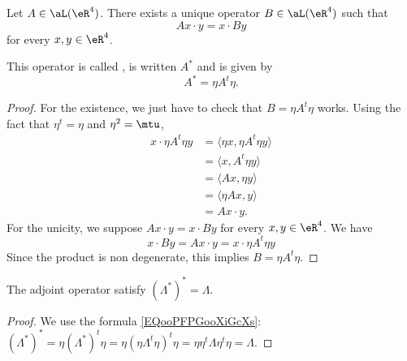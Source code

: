 \begin{propositionDef}
	Let \( A\in \aL(\eR^4)\). There exists a unique operator \( B\in \aL(\eR^4)\) such that
	\begin{equation}
		Ax\cdot y=x\cdot By
	\end{equation}
	for every \( x,y\in\eR^4\).

	This operator is called , is written \( A^*\) and is given by
	\begin{equation}        \label{EQooPFPGooXiGcXs}
		A^*=\eta A^t\eta.
	\end{equation}
\end{propositionDef}

\begin{proof}
	For the existence, we just have to check that \( B=\eta A^t\eta\) works. Using the fact that \( \eta^t=\eta\) and \( \eta^2=\mtu\),
	\begin{subequations}
		\begin{align}
			x\cdot \eta A^t\eta y & =\langle \eta x, \eta A^t\eta y\rangle \\
			                      & =\langle x, A^t\eta y\rangle           \\
			                      & =\langle Ax, \eta y\rangle             \\
			                      & =\langle \eta Ax, y\rangle             \\
			                      & =Ax\cdot y.
		\end{align}
	\end{subequations}
	For the unicity, we suppose $Ax\cdot y=x\cdot By$ for every \( x,y\in \eR^4\). We have
	\begin{equation}
		x\cdot By=Ax\cdot y=x\cdot \eta A^t\eta y
	\end{equation}
	Since the product is non degenerate, this implies \( B=\eta A^t\eta\).
\end{proof}

\begin{lemma}       \label{LEMooVRWJooPsDRwU}
	The adjoint operator satisfy \( (\Lambda^*)^*=\Lambda\).
\end{lemma}

\begin{proof}
	We use the formula \eqref{EQooPFPGooXiGcXs}: $(\Lambda^*)^*=\eta (\Lambda^*)^t\eta=\eta(\eta \Lambda^t\eta)^t\eta=\eta\eta^t\Lambda\eta^t\eta=\Lambda$.
\end{proof}

